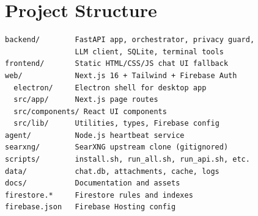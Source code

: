 \documentclass[a4paper,11pt,twoside]{report}
\begin{document}
\chapter{Project Structure}

\begin{lstlisting}
backend/        FastAPI app, orchestrator, privacy guard,
                LLM client, SQLite, terminal tools
frontend/       Static HTML/CSS/JS chat UI fallback
web/            Next.js 16 + Tailwind + Firebase Auth
  electron/     Electron shell for desktop app
  src/app/      Next.js page routes
  src/components/ React UI components
  src/lib/      Utilities, types, Firebase config
agent/          Node.js heartbeat service
searxng/        SearXNG upstream clone (gitignored)
scripts/        install.sh, run_all.sh, run_api.sh, etc.
data/           chat.db, attachments, cache, logs
docs/           Documentation and assets
firestore.*     Firestore rules and indexes
firebase.json   Firebase Hosting config
\end{lstlisting}
\end{document}
